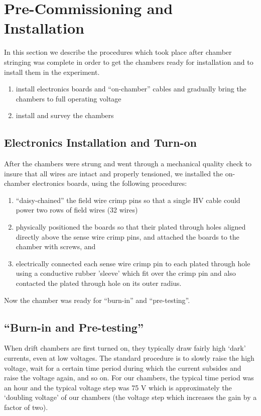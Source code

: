 \section{Pre-Commissioning and Installation}

In this section we describe the procedures which took
place after chamber stringing was complete in order to get the
chambers ready for installation and to install them 
in the experiment.

\begin{enumerate}
\item install electronics boards and ``on-chamber'' cables
and gradually bring the chambers to full operating voltage 
\item install and survey the chambers
\end{enumerate}

\subsection{Electronics Installation and Turn-on}
After the chambers were strung and went through a mechanical quality
check to insure that all wires are intact and properly tensioned, we
installed the on-chamber electronics boards, using
the following procedures:
\begin{enumerate}
\item ``daisy-chained'' the field wire crimp pins so that a single
HV cable could power two rows of field wires (32 wires)
\item physically positioned the boards so that their plated through
holes aligned directly above the sense wire crimp pins, and attached
the boards to the chamber with screws, and
\item electrically connected each sense wire crimp pin to each
plated through hole using a conductive rubber 'sleeve' which fit
over the crimp pin and also contacted the plated through hole on
its outer radius.
\end{enumerate}

Now the chamber was ready for ``burn-in'' and ``pre-testing''.

\subsection{``Burn-in and Pre-testing''}
When drift chambers are first turned on, they typically draw fairly high
`dark' currents, even at low voltages.  The standard procedure is to
slowly raise the high voltage, wait for a certain time period during
which the current subsides and raise the voltage again, and so on.
For our chambers, the typical time period was an hour and the typical
voltage step was 75 V which is approximately the `doubling voltage' of
our chambers (the voltage step which increases the gain by a factor
of two).

